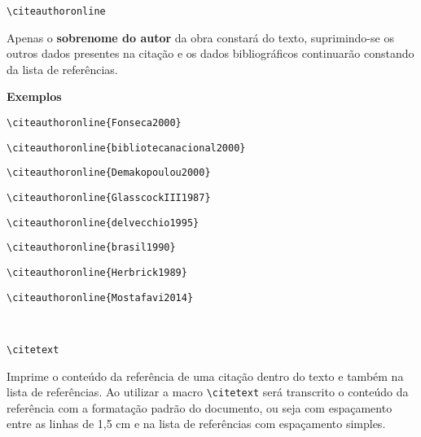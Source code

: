 \begin{alineas}
\item
\begin{verbatim}
\citeauthoronline
\end{verbatim}

Apenas o \textbf{sobrenome do autor} da obra constar\'a do texto, suprimindo-se os outros dados presentes na cita\c{c}\~ao e os dados bibliogr\'aficos continuar\~ao constando da lista de refer\^encias.

\textbf{Exemplos}

\begin{verbatim}
\citeauthoronline{Fonseca2000}
\end{verbatim}

\begin{verbatim}
\citeauthoronline{bibliotecanacional2000}
\end{verbatim}

\begin{verbatim}
\citeauthoronline{Demakopoulou2000}
\end{verbatim}

\begin{verbatim}
\citeauthoronline{GlasscockIII1987}
\end{verbatim}

\begin{verbatim}
\citeauthoronline{delvecchio1995}
\end{verbatim}

\begin{verbatim}
\citeauthoronline{brasil1990}
\end{verbatim}

\begin{verbatim}
\citeauthoronline{Herbrick1989}
\end{verbatim}

\begin{verbatim}
\citeauthoronline{Mostafavi2014}
\end{verbatim}
\\

\item
\begin{verbatim}
\citetext
\end{verbatim}

Imprime o conte\'udo da refer\^encia de uma cita\c{c}\~ao dentro do texto e tamb\'em na lista de refer\^encias. Ao utilizar a macro  \verb+\citetext+ ser\'a transcrito o conte\'udo da refer\^encia com a formata\c{c}\~ao padr\~ao do documento, ou seja com espa\c{c}amento entre as linhas de 1,5 cm e na lista de refer\^encias com espa\c{c}amento simples.


\end{alineas}
